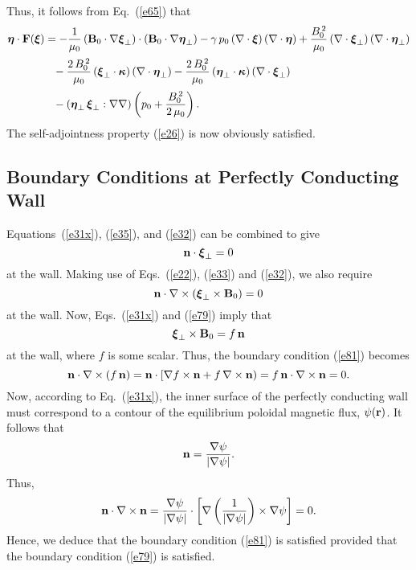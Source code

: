 \documentclass[12pt,prb,aps,notitlepage]{revtex4-1}
\newcommand{\bxi}{\mbox{\boldmath$\xi$}}
\newcommand{\bta}{\mbox{\boldmath$\eta$}}
\newcommand{\bkappa}{\mbox{\boldmath$\kappa$}}
\begin{document}
Thus, it follows from Eq.~(\ref{e65}) that 
 \begin{align}
 \bta\cdot {\bf F}(\bxi) &= - \frac{1}{\mu_0}\,({\bf B}_0\cdot\nabla\bxi_\perp)\cdot
 ({\bf B}_0\cdot\nabla\bta_\perp)-\gamma\,p_0\,(\nabla\cdot\bxi)\,(\nabla\cdot\bta)+\frac{B_0^{\,2}}{\mu_0}\,(\nabla\cdot\bxi_\perp)\,(\nabla\cdot\bta_\perp) 
\nonumber\\[0.5ex]
 &\phantom{=}-\frac{2\,B_0^{\,2}}{\mu_0}\,(\bxi_\perp\cdot\bkappa)\, (\nabla\cdot\bta_\perp)-\frac{2\,B_0^{\,2}}{\mu_0}\,(\bta_\perp\cdot\bkappa)\,(\nabla\cdot\bxi_\perp)\nonumber\\[0.5ex]
 &\phantom{=}
 -(\bta_\perp\,\bxi_\perp : \nabla\nabla)\left(p_0 + \frac{B_0^{\,2}}{2\,\mu_0}\right).
\end{align}
The self-adjointness property (\ref{e26}) is now obviously satisfied. 

\subsection{Boundary Conditions at Perfectly Conducting Wall}
Equations~(\ref{e31x}), (\ref{e35}), and (\ref{e32}) can be combined to give 
\begin{equation}\label{e79}
{\bf n} \cdot\bxi_\perp = 0
\end{equation}
at the wall. Making use of Eqs.~(\ref{e22}), (\ref{e33}) and (\ref{e32}),
we also require
\begin{equation}\label{e81}
{\bf n}\cdot\nabla\times(\bxi_\perp\times {\bf B}_0) = 0
\end{equation}
at the wall. Now, Eqs.~(\ref{e31x}) and (\ref{e79})  imply that
\begin{equation}
\bxi_\perp\times {\bf B}_0= f\,{\bf n}
\end{equation}
at the wall, where $f$ is some scalar.
Thus, the boundary condition (\ref{e81}) becomes
\begin{equation}
{\bf n}\cdot \nabla\times (f\,{\bf n}) = {\bf n}\cdot[\nabla f\times {\bf n} + f\,\nabla\times {\bf n})= f\,{\bf n}\cdot\nabla\times {\bf n} = 0.
\end{equation}
Now, according to Eq.~(\ref{e31x}), the inner surface of the perfectly conducting wall must correspond to a contour of the equilibrium poloidal
magnetic flux,  $\psi({\bf r})$. 
It follows that
\begin{equation}
{\bf n} = \frac{\nabla\psi}{|\nabla\psi|}.
\end{equation}
Thus,
\begin{equation}
{\bf n}\cdot\nabla\times {\bf n} = \frac{\nabla\psi}{|\nabla\psi|}\cdot \left[\nabla\left(\frac{1}{|\nabla\psi|}\right)\times \nabla\psi\right]=0.
\end{equation}
Hence, we deduce that the boundary condition (\ref{e81}) is satisfied provided that the boundary condition (\ref{e79}) is satisfied. 
\end{document}
